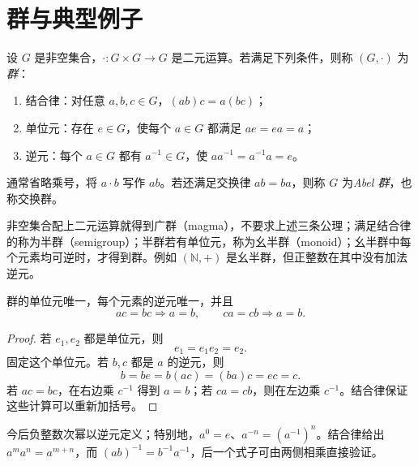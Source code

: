 \documentclass[lang=cn,a4paper,fontset=none,zihao=false,10pt,openany,twoside]{beautybook}
\numberwithin{algorithm}{chapter}
\newcommand{\N}{\mathbb N}
\begin{document}
\section{群与典型例子}\label{sec:groups-start}
\begin{definition}[群]
设 $G$ 是非空集合，$\cdot:G\times G\to G$ 是二元运算。若满足下列条件，则称 $(G,\cdot)$ 为\emph{群}：
\begin{enumerate}[(1)]
\item 结合律：对任意 $a,b,c\in G$，$(ab)c=a(bc)$；
\item 单位元：存在 $e\in G$，使每个 $a\in G$ 都满足 $ae=ea=a$；
\item 逆元：每个 $a\in G$ 都有 $a^{-1}\in G$，使 $aa^{-1}=a^{-1}a=e$。
\end{enumerate}
通常省略乘号，将 $a\cdot b$ 写作 $ab$。若还满足交换律 $ab=ba$，则称 $G$ 为\emph{Abel 群}，也称交换群。
\end{definition}
\begin{remark}[从二元运算到群]
非空集合配上二元运算就得到广群（magma），不要求上述三条公理；满足结合律的称为半群（semigroup）；半群若有单位元，称为幺半群（monoid）；幺半群中每个元素均可逆时，才得到群。例如 $(\N,+)$ 是幺半群，但正整数在其中没有加法逆元。
\end{remark}

\begin{proposition}\label{prop:group-cancellation}
群的单位元唯一，每个元素的逆元唯一，并且
\[
 ac=bc\Longrightarrow a=b,\qquad ca=cb\Longrightarrow a=b.
\]
\end{proposition}
\begin{proof}
若 $e_1,e_2$ 都是单位元，则
\[
 e_1=e_1e_2=e_2.
\]
固定这个单位元。若 $b,c$ 都是 $a$ 的逆元，则
\[
 b=be=b(ac)=(ba)c=ec=c.
\]
若 $ac=bc$，在右边乘 $c^{-1}$ 得到 $a=b$；若 $ca=cb$，则在左边乘 $c^{-1}$。结合律保证这些计算可以重新加括号。
\end{proof}
今后负整数次幂以逆元定义；特别地，$a^0=e$、$a^{-n}=(a^{-1})^n$。结合律给出 $a^m a^n=a^{m+n}$，而 $(ab)^{-1}=b^{-1}a^{-1}$，后一个式子可由两侧相乘直接验证。
\end{document}
